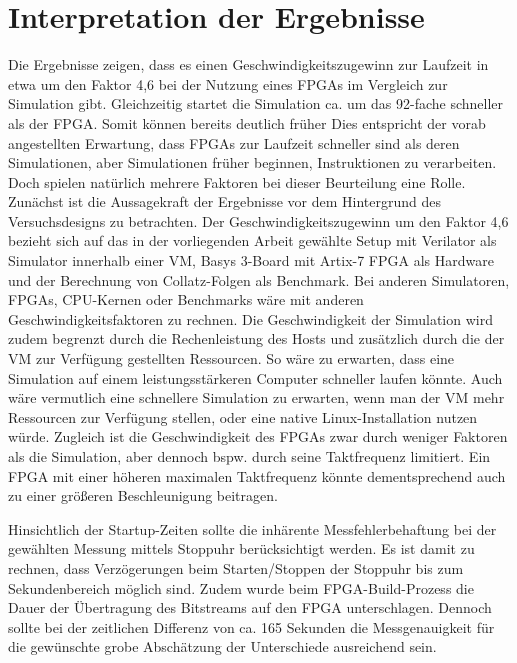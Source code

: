 \section{Interpretation der Ergebnisse}
    Die Ergebnisse zeigen, dass es einen Geschwindigkeitszugewinn zur Laufzeit in etwa um den Faktor 4,6 bei der Nutzung eines FPGAs im Vergleich zur Simulation gibt.
    Gleichzeitig startet die Simulation ca. um das 92-fache schneller als der FPGA.
    Somit können bereits deutlich früher
    Dies entspricht der vorab angestellten Erwartung, dass FPGAs zur Laufzeit schneller sind als deren Simulationen, aber Simulationen früher beginnen, Instruktionen zu verarbeiten.
    Doch spielen natürlich mehrere Faktoren bei dieser Beurteilung eine Rolle.
    Zunächst ist die Aussagekraft der Ergebnisse vor dem Hintergrund des Versuchsdesigns zu betrachten.
    Der Geschwindigkeitszugewinn um den Faktor 4,6 bezieht sich auf das in der vorliegenden Arbeit gewählte Setup mit Verilator als Simulator innerhalb einer VM, Basys 3-Board mit Artix-7 FPGA als Hardware und der Berechnung von Collatz-Folgen als Benchmark.
    Bei anderen Simulatoren, FPGAs, CPU-Kernen oder Benchmarks wäre mit anderen Geschwindigkeitsfaktoren zu rechnen.
    Die Geschwindigkeit der Simulation wird zudem begrenzt durch die Rechenleistung des Hosts und zusätzlich durch die der VM zur Verfügung gestellten Ressourcen.
    So wäre zu erwarten, dass eine Simulation auf einem leistungsstärkeren Computer schneller laufen könnte.
    Auch wäre vermutlich eine schnellere Simulation zu erwarten, wenn man der VM mehr Ressourcen zur Verfügung stellen, oder eine native Linux-Installation nutzen würde.
    Zugleich ist die Geschwindigkeit des FPGAs zwar durch weniger Faktoren als die Simulation, aber dennoch bspw. durch seine Taktfrequenz limitiert.
    Ein FPGA mit einer höheren maximalen Taktfrequenz könnte dementsprechend auch zu einer größeren Beschleunigung beitragen.

    Hinsichtlich der Startup-Zeiten sollte die inhärente Messfehlerbehaftung bei der gewählten Messung mittels Stoppuhr berücksichtigt werden.
    Es ist damit zu rechnen, dass Verzögerungen beim Starten/Stoppen der Stoppuhr bis zum Sekundenbereich möglich sind.
    Zudem wurde beim FPGA-Build-Prozess die Dauer der Übertragung des Bitstreams auf den FPGA unterschlagen.
    Dennoch sollte bei der zeitlichen Differenz von ca. 165 Sekunden die Messgenauigkeit für die gewünschte grobe Abschätzung der Unterschiede ausreichend sein.



